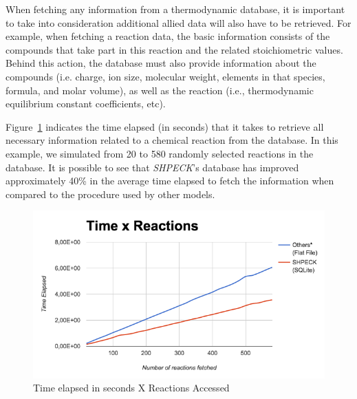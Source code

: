 \documentclass[preprint,12pt,3p]{elsarticle}
\begin{document}
When fetching any information from a thermodynamic database, it is important to take into consideration additional allied data will also have to be retrieved. For example, when fetching a reaction data, the basic information consists of the compounds that take part in this reaction and the related stoichiometric values. Behind this action, the database must also provide information about the compounds (i.e. charge, ion size, molecular weight, elements in that species, formula, and molar volume), as well as the reaction (i.e., thermodynamic equilibrium constant coefficients, etc).

Figure~\ref{fig:timeXaccess} indicates the time elapsed (in seconds) that it takes to retrieve all necessary information related to a chemical reaction from the database. In this example, we simulated from 20 to 580 randomly selected reactions in the database. It is possible to see that \emph{SHPECK}'s database has improved approximately 40\% in the average time elapsed to fetch the information when compared to the procedure used by other models.

\begin{figure}[ht!]
\centering
\includegraphics[width=140mm]{timeXreactionAccess.png}
\caption{Time elapsed in seconds X Reactions Accessed}
\label{fig:timeXaccess}
\end{figure}
\end{document}
